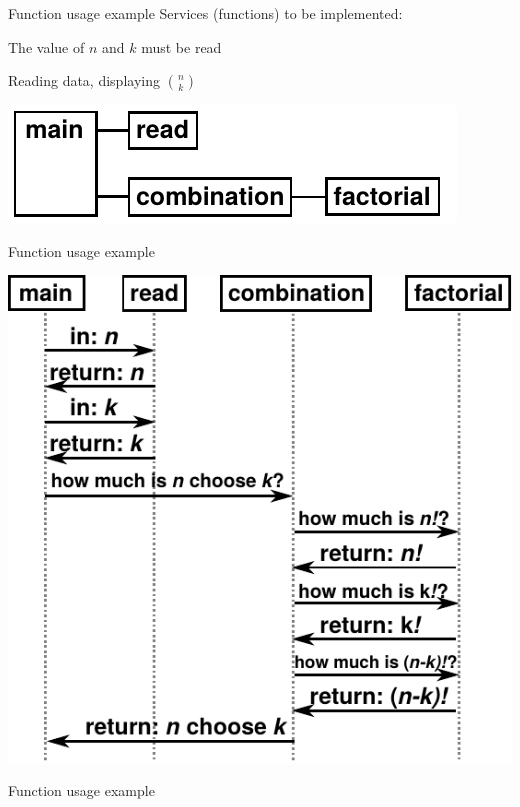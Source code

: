 \documentclass[usenames,dvipsnames,aspectratio=169]{beamer}
\begin{document}
\begin{frame}{Function usage example}
  Services (functions) to be implemented:
  \vfill
  \begin{description}[mm]
    \item[Read] The value of $n$ and $k$ must be read
    \item[Main] Reading data, displaying ${n \choose k}$
  \end{description}
  \vfill
  \begin{center}
    \includegraphics{nk.pdf}
  \end{center}
\end{frame}

\begin{frame}{Function usage example}
  \begin{center}
    \includegraphics[scale=0.75]{nk2.pdf}
  \end{center}
\end{frame}

\begin{frame}{Function usage example}
  \begin{exampleblock}{}
    \small
    \vspace{-.3cm}
    
    \vspace{-.3cm}
  \end{exampleblock}
\end{frame}
\end{document}
